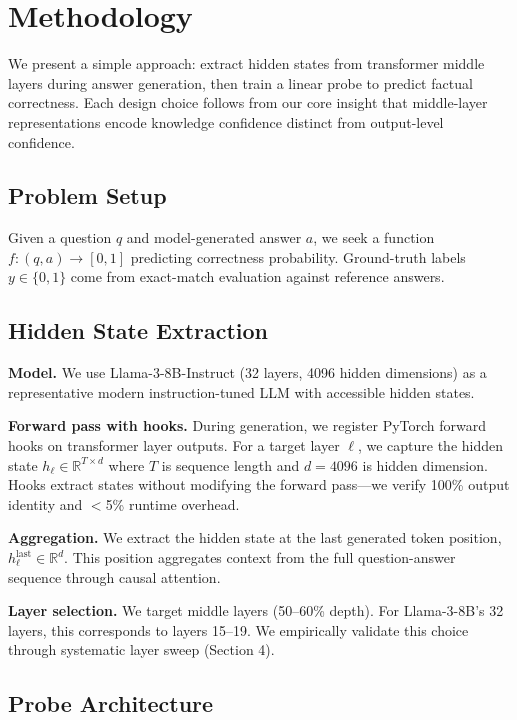 \section{Methodology}

We present a simple approach: extract hidden states from transformer middle layers during answer generation, then train a linear probe to predict factual correctness. Each design choice follows from our core insight that middle-layer representations encode knowledge confidence distinct from output-level confidence.

\subsection{Problem Setup}

Given a question $q$ and model-generated answer $a$, we seek a function $f: (q, a) \rightarrow [0, 1]$ predicting correctness probability. Ground-truth labels $y \in \{0, 1\}$ come from exact-match evaluation against reference answers.

\subsection{Hidden State Extraction}

\textbf{Model.} We use Llama-3-8B-Instruct (32 layers, 4096 hidden dimensions) as a representative modern instruction-tuned LLM with accessible hidden states.

\textbf{Forward pass with hooks.} During generation, we register PyTorch forward hooks on transformer layer outputs. For a target layer $\ell$, we capture the hidden state $h_\ell \in \mathbb{R}^{T \times d}$ where $T$ is sequence length and $d = 4096$ is hidden dimension. Hooks extract states without modifying the forward pass---we verify 100\% output identity and $<$5\% runtime overhead.

\textbf{Aggregation.} We extract the hidden state at the last generated token position, $h_\ell^{\text{last}} \in \mathbb{R}^d$. This position aggregates context from the full question-answer sequence through causal attention.

\textbf{Layer selection.} We target middle layers (50--60\% depth). For Llama-3-8B's 32 layers, this corresponds to layers 15--19. We empirically validate this choice through systematic layer sweep (Section 4).

\subsection{Probe Architecture}

